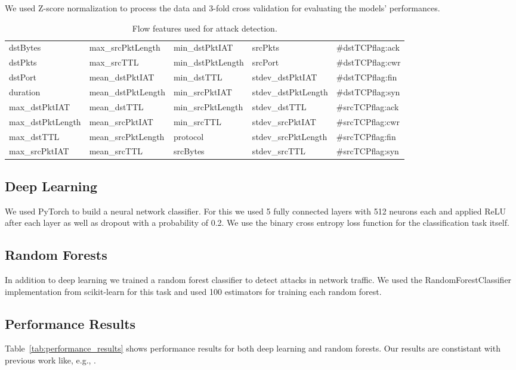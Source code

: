 \documentclass[sigconf,nonacm]{acmart}
\begin{document}
We used Z-score normalization to process the data and 3-fold cross validation for evaluating the models' performances.

\begin{table}
\renewcommand*{\arraystretch}{1.2} %
\caption{Flow features used for attack detection.}
\label{tab:features}
\begin{tabular}{l l l l l} \toprule
dstBytes	&	max\_srcPktLength	&	min\_dstPktIAT	&	srcPkts	&	\#dstTCPflag:ack	\\
dstPkts	&	max\_srcTTL	&	min\_dstPktLength	&	srcPort	&	\#dstTCPflag:cwr	\\
dstPort	&	mean\_dstPktIAT	&	min\_dstTTL	&	stdev\_dstPktIAT	&	\#dstTCPflag:fin	\\
duration	&	mean\_dstPktLength	&	min\_srcPktIAT	&	stdev\_dstPktLength	&	\#dstTCPflag:syn	\\
max\_dstPktIAT	&	mean\_dstTTL	&	min\_srcPktLength	&	stdev\_dstTTL	&	\#srcTCPflag:ack	\\
max\_dstPktLength	&	mean\_srcPktIAT	&	min\_srcTTL	&	stdev\_srcPktIAT	&	\#srcTCPflag:cwr	\\
max\_dstTTL	&	mean\_srcPktLength	&	protocol	&	stdev\_srcPktLength	&	\#srcTCPflag:fin	\\
max\_srcPktIAT	&	mean\_srcTTL	&	srcBytes	&	stdev\_srcTTL	&	\#srcTCPflag:syn	\\
 \bottomrule
\end{tabular}
\end{table}
 
\subsection{Deep Learning}
We used PyTorch to build a neural network classifier. For this we used 5 fully connected layers with 512 neurons each and applied ReLU after each layer as well as dropout with a probability of 0.2. We use the binary cross entropy loss function for the classification task itself. 

\subsection{Random Forests}
In addition to deep learning we trained a random forest classifier to detect attacks in network traffic. We used the RandomForestClassifier implementation from scikit-learn for this task and used 100 estimators for training each random forest.


\subsection{Performance Results}
Table~\ref{tab:performance_results} shows performance results for both deep learning and random forests. Our results are constistant with previous work like, e.g., \cite{fares}.
\end{document}
